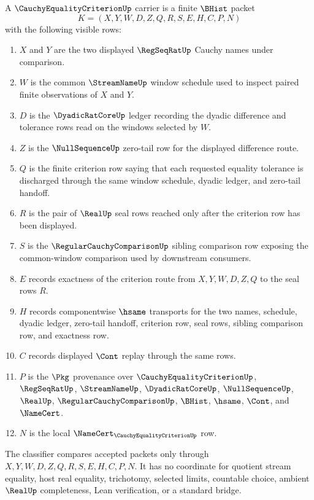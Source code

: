 \begin{definition}
\label{def:cauchy-equality-criterion-carrier}
A $\CauchyEqualityCriterionUp$ carrier is a finite $\BHist$ packet
$$
K=(X,Y,W,D,Z,Q,R,S,E,H,C,P,N)
$$
with the following visible rows:
\begin{enumerate}
\item $X$ and $Y$ are the two displayed $\RegSeqRatUp$ Cauchy names under comparison.
\item $W$ is the common $\StreamNameUp$ window schedule used to inspect paired finite observations of $X$ and $Y$.
\item $D$ is the $\DyadicRatCoreUp$ ledger recording the dyadic difference and tolerance rows read on the windows selected by $W$.
\item $Z$ is the $\NullSequenceUp$ zero-tail row for the displayed difference route.
\item $Q$ is the finite criterion row saying that each requested equality tolerance is discharged through the same window schedule, dyadic ledger, and zero-tail handoff.
\item $R$ is the pair of $\RealUp$ seal rows reached only after the criterion row has been displayed.
\item $S$ is the $\RegularCauchyComparisonUp$ sibling comparison row exposing the common-window comparison used by downstream consumers.
\item $E$ records exactness of the criterion route from $X,Y,W,D,Z,Q$ to the seal rows $R$.
\item $H$ records componentwise $\hsame$ transports for the two names, schedule, dyadic ledger, zero-tail handoff, criterion row, seal rows, sibling comparison row, and exactness row.
\item $C$ records displayed $\Cont$ replay through the same rows.
\item $P$ is the $\Pkg$ provenance over $\CauchyEqualityCriterionUp$, $\RegSeqRatUp$, $\StreamNameUp$, $\DyadicRatCoreUp$, $\NullSequenceUp$, $\RealUp$, $\RegularCauchyComparisonUp$, $\BHist$, $\hsame$, $\Cont$, and $\NameCert$.
\item $N$ is the local $\NameCert_{\CauchyEqualityCriterionUp}$ row.
\end{enumerate}
The classifier compares accepted packets only through $X,Y,W,D,Z,Q,R,S,E,H,C,P,N$. It has no coordinate for quotient stream equality, host real equality, trichotomy, selected limits, countable choice, ambient $\RealUp$ completeness, Lean verification, or a standard bridge.
\end{definition}

